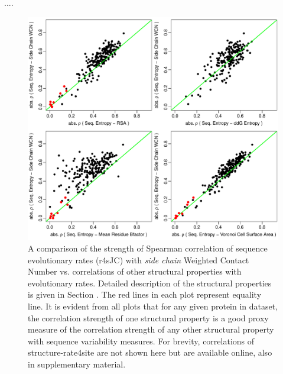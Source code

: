\documentclass[11pt]{article}
\begin{document}
....



    \begin{figure}[tbh]
            \begin{center}
            \includegraphics[width=6.9in]{cordiv_similarities_seqent.pdf}
            \end{center}
            \caption{A comparison of the strength of Spearman correlation of sequence evolutionary rates (r4sJC) with {\it side chain} Weighted Contact Number vs. correlations of other structural properties with evolutionary rates. Detailed description of the structural properties is given in Section \label{sec:mam}. The red lines in each plot represent equality line. It is evident from all plots that for any given protein in dataset, the correlation strength of one structural property is a good proxy measure of the correlation strength of any other structural property with sequence variability measures. For brevity, correlations of structure-rate4site are not shown here but are available online, also in supplementary material.}
            \label{fig:seqent_structure_cors}
    \end{figure}
\end{document}
